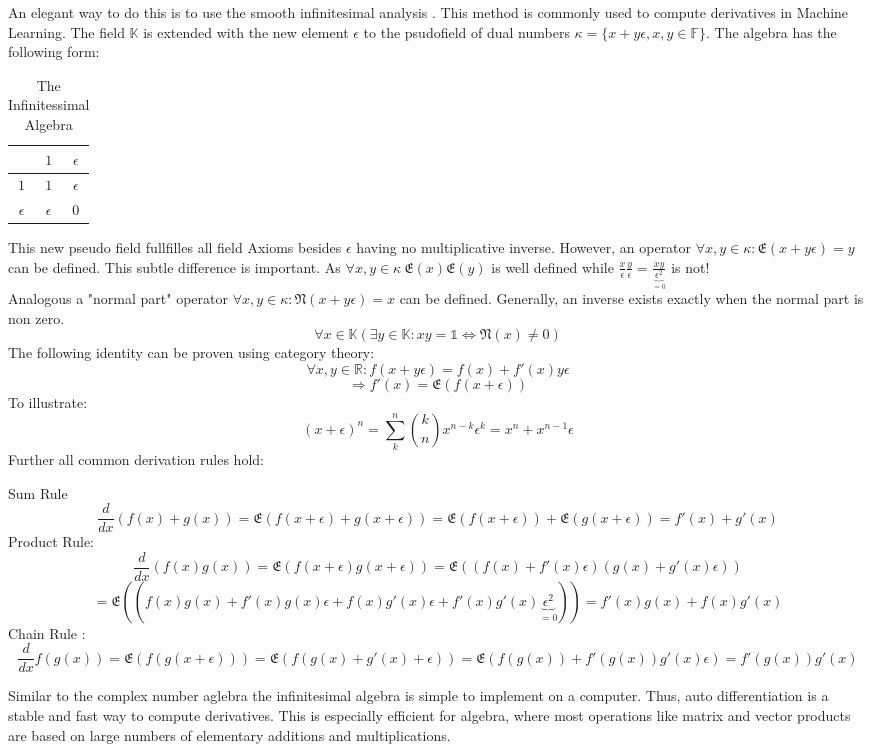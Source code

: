 \documentclass[Master]{subfiles}
\begin{document}
An elegant way to do this is to use the smooth infinitesimal analysis \cite{bell1988infinitesimals} \cite{grunwald1906duale}. This method is commonly used to compute derivatives in Machine Learning.
The field $\mathbb{K}$ is extended with the new element $\epsilon$ to the psudofield of dual numbers $\mathbb{\kappa} = \{x+y\epsilon, x,y \in \mathbb{F}\}$. The algebra has the following form:
\begin{table}[H]
    \centering
    \begin{tabular}{c|cc}
         &$1$ & $\epsilon$\\
         \hline
         $1$&$1$ &$ \epsilon$\\
        $\epsilon$ & $\epsilon$&$0$
    \end{tabular}
    \caption{The Infinitessimal Algebra}
    \label{tab:my_label}
\end{table}
This new pseudo field fullfilles all field Axioms besides $\epsilon$ having no multiplicative inverse. However, an operator $\forall x,y \in \mathbb{\kappa} : \mathfrak{E}(x+y\epsilon) = y$ can be defined. This subtle difference is important. As $ \forall x,y \in \mathbb{\kappa} \ \mathfrak{E}(x)\mathfrak{E}(y)$ is well defined while $\frac{x}{\epsilon}\frac{y}{\epsilon} = \frac{xy}{\underbrace{\epsilon^2}_{=0}}$ is not!\\ Analogous a "normal part" operator $\forall x,y \in \mathbb{\kappa} : \mathfrak{N}(x+y\epsilon) = x$ can be defined. Generally, an inverse exists exactly when the normal part is non zero.
$$
\forall x \in \mathbb{K} \left(\exists y \in \mathbb{K} : x y = \mathbb{1} \iff \mathfrak{N}(x)\neq 0 \right)
$$
The following identity can be proven using category theory\cite{bell1988infinitesimals}:
$$\forall x,y \in \mathbb{R} : f(x+y\epsilon) = f(x)+ f'(x)y \epsilon$$
$$\Rightarrow f'(x) = \mathfrak{E}(f(x+\epsilon))$$
To illustrate:
$$
(x+\epsilon)^n = \sum_k^n \binom{k}{n} x^{n-k} \epsilon^k = x^n + x^{n-1}\epsilon 
$$
Further all common derivation rules hold:
\begin{center}
Sum Rule
$$ \frac{d}{dx} (f(x)+g(x)) = \mathfrak{E}(f(x+\epsilon) + g(x+\epsilon)) = \mathfrak{E}(f(x+\epsilon)) + \mathfrak{E}(g(x+\epsilon)) = f'(x)+g'(x)$$
Product Rule:
$$ \frac{d}{dx} (f(x)g(x)) = \mathfrak{E}(f(x+\epsilon)  g(x+\epsilon)) = \mathfrak{E}((f(x)+f'(x) \epsilon)(g(x)+g'(x)\epsilon)) 
$$
$$=\mathfrak{E}((f(x)g(x) +f'(x)g(x) \epsilon+f(x)g'(x)\epsilon + f'(x)g'(x)\underbrace{\epsilon^2}_{=0})) = f'(x)g(x)+f(x)g'(x)$$
Chain Rule :
$$ \frac{d}{dx} f(g(x)) = \mathfrak{E}(f(g(x+\epsilon))) = \mathfrak{E}(f(g(x)+g'(x)+\epsilon))  =
\mathfrak{E}(f(g(x))+f'(g(x))g'(x)\epsilon)=f'(g(x))g'(x)$$
\end{center}
Similar to the complex number aglebra the infinitesimal algebra is simple to implement on a computer. Thus, auto differentiation is a stable and fast way to compute derivatives. This is especially efficient for algebra, where most operations like matrix and vector products are based on large numbers of elementary additions and multiplications.
\end{document}

